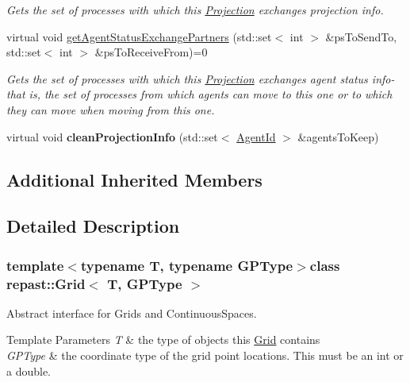 \begin{DoxyCompactItemize}
\begin{DoxyCompactList}\small\item\em Gets the set of processes with which this \hyperlink{classrepast_1_1_projection}{Projection} exchanges projection info. \end{DoxyCompactList}\item 
virtual void \hyperlink{classrepast_1_1_grid_a748354698308fe0d0c0fe33a657109d1}{get\-Agent\-Status\-Exchange\-Partners} (std\-::set$<$ int $>$ \&ps\-To\-Send\-To, std\-::set$<$ int $>$ \&ps\-To\-Receive\-From)=0
\begin{DoxyCompactList}\small\item\em Gets the set of processes with which this \hyperlink{classrepast_1_1_projection}{Projection} exchanges agent status info-\/ that is, the set of processes from which agents can move to this one or to which they can move when moving from this one. \end{DoxyCompactList}\item 
\hypertarget{classrepast_1_1_grid_ae4b6d41862836606e0393df7558e4d20}{virtual void {\bfseries clean\-Projection\-Info} (std\-::set$<$ \hyperlink{classrepast_1_1_agent_id}{Agent\-Id} $>$ \&agents\-To\-Keep)}\label{classrepast_1_1_grid_ae4b6d41862836606e0393df7558e4d20}

\end{DoxyCompactItemize}
\subsection*{Additional Inherited Members}


\subsection{Detailed Description}
\subsubsection*{template$<$typename T, typename G\-P\-Type$>$class repast\-::\-Grid$<$ T, G\-P\-Type $>$}

Abstract interface for Grids and Continuous\-Spaces. 


\begin{DoxyTemplParams}{Template Parameters}
{\em T} & the type of objects this \hyperlink{classrepast_1_1_grid}{Grid} contains \\
\hline
{\em G\-P\-Type} & the coordinate type of the grid point locations. This must be an int or a double. \\
\hline
\end{DoxyTemplParams}


